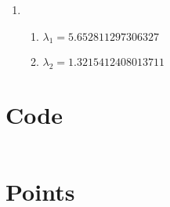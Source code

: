 \documentclass{article}
\begin{document}
\begin{enumerate}
      \item \begin{enumerate}
                  \item \begin{math}
                              \lambda_1=5.652811297306327
                        \end{math}
                  \item \begin{math}
                              \lambda_2=1.3215412408013711
                        \end{math}
            \end{enumerate}
\end{enumerate}

\pagebreak

\section{Code}
\inputminted{python3}{main.py}

\section{Points} \label{points}

\end{document}
